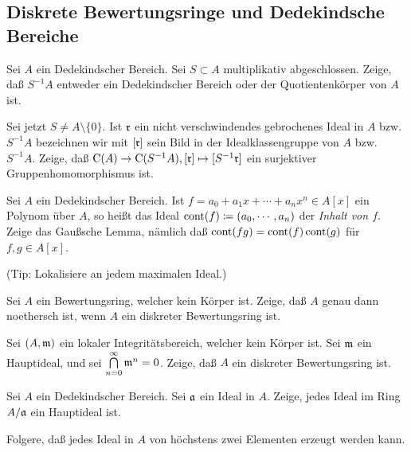 \subsection{Diskrete Bewertungsringe und Dedekindsche Bereiche}

\begin{exercise}
	Sei \(A\) ein Dedekindscher Bereich. Sei \(S \subset A\) multiplikativ
	abgeschlossen. Zeige, daß \(S^{-1} A\) entweder ein Dedekindscher Bereich
	oder der Quotientenkörper von \(A\) ist.
	
	Sei jetzt \(S \neq A \setminus \{0\}\). Ist \(\mathfrak{r}\) ein nicht
	verschwindendes gebrochenes Ideal in \(A\) bzw.~\(S^{-1} A\) bezeichnen wir
	mit \([\mathfrak{r}]\) sein Bild in der Idealklassengruppe von
	\(A\) bzw.\ \(S^{-1} A\). Zeige, daß
	\(\operatorname{C}(A) \to \operatorname{C}(S^{-1} A), [\mathfrak{r}] \mapsto [S^{-1} \mathfrak{r}]\)
	ein surjektiver Gruppenhomomorphismus ist.
\end{exercise}

\begin{exercise}
	Sei \(A\) ein Dedekindscher Bereich. Ist \(f = a_0 + a_1 x + \dotsb + a_n
	x^n \in A[x]\) ein Polynom über \(A\), so heißt das Ideal \(\operatorname{cont}(f)
	\coloneqq (a_0, \dotsb, a_n)\) der \emph{Inhalt von \(f\)}. Zeige das
	Gaußsche Lemma, nämlich daß \(\operatorname{cont}(fg) = \operatorname{cont}(f) \operatorname{cont}(g)\) für
	\(f, g \in A[x]\).
	
	(Tip: Lokalisiere an jedem maximalen Ideal.)
\end{exercise}

\begin{exercise}
	Sei \(A\) ein Bewertungsring, welcher kein Körper ist. Zeige, daß \(A\)
	genau dann noethersch ist, wenn \(A\) ein diskreter Bewertungsring ist.
\end{exercise}

\begin{exercise}
	Sei \((A, \mathfrak{m})\) ein lokaler Integritätsbereich, welcher kein
	Körper ist. Sei \(\mathfrak{m}\) ein Hauptideal, und sei \(\bigcap\limits_{n = 0}^\infty
	\mathfrak{m}^n = 0\). Zeige, daß \(A\) ein diskreter Bewertungsring ist.
\end{exercise}

\begin{exercise}
	Sei \(A\) ein Dedekindscher Bereich. Sei \(\mathfrak{a}\) ein Ideal in \(A\).
	Zeige, jedes Ideal im Ring \(A/\mathfrak{a}\) ein Hauptideal ist.
	
	Folgere, daß jedes Ideal in \(A\) von höchstens zwei Elementen erzeugt werden
	kann.
\end{exercise}

